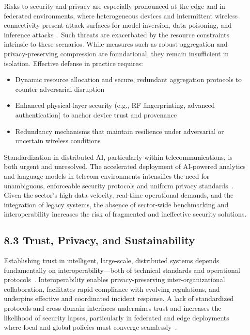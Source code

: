 \documentclass[11pt]{article}
\begin{document}
Risks to security and privacy are especially pronounced at the edge and in federated environments, where heterogeneous devices and intermittent wireless connectivity present attack surfaces for model inversion, data poisoning, and inference attacks~\cite{ref17,ref19,ref23,ref24}. Such threats are exacerbated by the resource constraints intrinsic to these scenarios. While measures such as robust aggregation and privacy-preserving compression are foundational, they remain insufficient in isolation. Effective defense in practice requires:

\begin{itemize}
    \item Dynamic resource allocation and secure, redundant aggregation protocols to counter adversarial disruption~\cite{ref49}
    \item Enhanced physical-layer security (e.g., RF fingerprinting, advanced authentication) to anchor device trust and provenance~\cite{ref48}
    \item Redundancy mechanisms that maintain resilience under adversarial or uncertain wireless conditions
\end{itemize}

Standardization in distributed AI, particularly within telecommunications, is both urgent and unresolved. The accelerated deployment of AI-powered analytics and language models in telecom environments intensifies the need for unambiguous, enforceable security protocols and uniform privacy standards~\cite{ref42,ref44,ref49}. Given the sector's high data velocity, real-time operational demands, and the integration of legacy systems, the absence of sector-wide benchmarking and interoperability increases the risk of fragmented and ineffective security solutions.

\subsection{8.3 Trust, Privacy, and Sustainability}

Establishing trust in intelligent, large-scale, distributed systems depends fundamentally on interoperability—both of technical standards and operational protocols~\cite{ref7,ref17,ref18,ref19,ref20,ref21,ref23,ref24,ref26}. Interoperability enables privacy-preserving inter-organizational collaboration, facilitates rapid compliance with evolving regulations, and underpins effective and coordinated incident response. A lack of standardized protocols and cross-domain interfaces undermines trust and increases the likelihood of security lapses, particularly in federated and edge deployments where local and global policies must converge seamlessly~\cite{ref26}.
\end{document}
